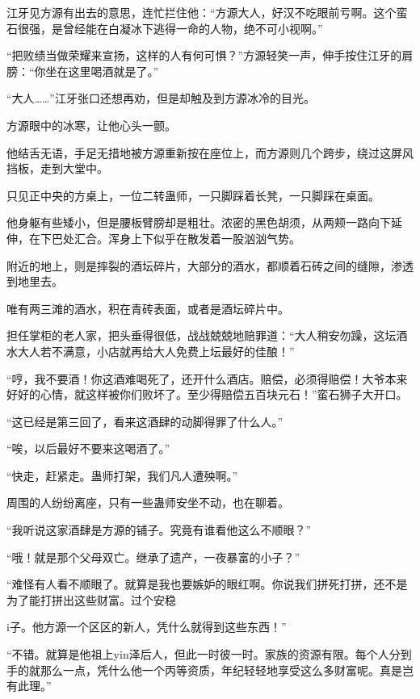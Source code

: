 
\begin{this_body}

江牙见方源有出去的意思，连忙拦住他：“方源大人，好汉不吃眼前亏啊。这个蛮石很强，是曾经能在白凝冰下逃得一命的人物，绝不可小视啊。”

“把败绩当做荣耀来宣扬，这样的人有何可惧？”方源轻笑一声，伸手按住江牙的肩膀：“你坐在这里喝酒就是了。”

“大人……”江牙张口还想再劝，但是却触及到方源冰冷的目光。

方源眼中的冰寒，让他心头一颤。

他结舌无语，手足无措地被方源重新按在座位上，而方源则几个跨步，绕过这屏风挡板，走到大堂中。

只见正中央的方桌上，一位二转蛊师，一只脚踩着长凳，一只脚踩在桌面。

他身躯有些矮小，但是腰板臂膀却是粗壮。浓密的黑色胡须，从两颊一路向下延伸，在下巴处汇合。浑身上下似乎在散发着一股汹汹气势。

附近的地上，则是摔裂的酒坛碎片，大部分的酒水，都顺着石砖之间的缝隙，渗透到地里去。

唯有两三滩的酒水，积在青砖表面，或者是酒坛碎片中。

担任掌柜的老人家，把头垂得很低，战战兢兢地赔罪道：“大人稍安勿躁，这坛酒水大人若不满意，小店就再给大人免费上坛最好的佳酿！”

“哼，我不要酒！你这酒难喝死了，还开什么酒店。赔偿，必须得赔偿！大爷本来好好的心情，就这样被你们败坏了。至少得赔偿五百块元石！”蛮石狮子大开口。

“这已经是第三回了，看来这酒肆的动脚得罪了什么人。”

“唉，以后最好不要来这喝酒了。”

“快走，赶紧走。蛊师打架，我们凡人遭殃啊。”

周围的人纷纷离座，只有一些蛊师安坐不动，也在聊着。

“我听说这家酒肆是方源的铺子。究竟有谁看他这么不顺眼？”

“哦！就是那个父母双亡。继承了遗产，一夜暴富的小子？”

“难怪有人看不顺眼了。就算是我也要嫉妒的眼红啊。你说我们拼死打拼，还不是为了能打拼出这些财富。过个安稳

i子。他方源一个区区的新人，凭什么就得到这些东西！”

“不错。就算是他祖上yin泽后人，但此一时彼一时。家族的资源有限。每个人分到手的就那么一点，凭什么他一个丙等资质，年纪轻轻地享受这么多财富呢。真是岂有此理。”


\end{this_body}
